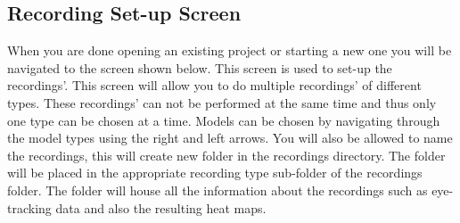\subsection{Recording Set-up Screen}
When you are done opening an existing project or starting a new one you will be navigated to the screen shown below. This screen is used to set-up the recordings'. This screen will allow you to do multiple recordings' of different types. These recordings' can not be performed at the same time and thus only one type can be chosen at a time. Models can be chosen by navigating through the model types using the right and left arrows. You will also be allowed to name the recordings, this will create new folder in the recordings directory. The folder will be placed in the appropriate recording type sub-folder of the recordings folder. The folder will house all the information about the recordings such as eye-tracking data and also the resulting heat maps. 

